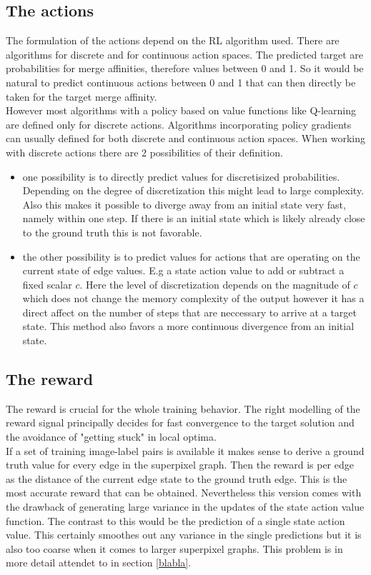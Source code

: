\subsection{The actions}
The formulation of the actions depend on the RL algorithm used. There are algorithms for discrete and for continuous action spaces. The predicted target are probabilities for merge affinities, therefore values between 0 and 1. So it would be natural to predict continuous actions between 0 and 1 that can then directly be taken for the target merge affinity.\\
However most algorithms with a policy based on value functions like Q-learning are defined only for discrete actions. Algorithms incorporating policy gradients can usually defined for both discrete and continuous action spaces. When working with discrete actions there are 2 possibilities of their definition. \\
\begin{itemize}
	\item one possibility is to directly predict values for discretisized probabilities. Depending on the degree of discretization this might lead to large complexity. Also this makes it possible to diverge away from an initial state very fast, namely within one step. If there is an initial state which is likely already close to the ground truth this is not favorable.
	\item the other possibility is to predict values for actions that are operating on the current state of edge values. E.g a state action value to add or subtract a fixed scalar $c$. Here the level of discretization depends on the magnitude of $c$ which does not change the memory complexity of the output however it has a direct affect on the number of steps that are neccessary to arrive at a target state. This method also favors a more continuous divergence from an initial state.
\end{itemize}

\subsection{The reward}
The reward is crucial for the whole training behavior. The right modelling of the reward signal principally decides for fast convergence to the target solution and the avoidance of "getting stuck" in local optima.\\
If a set of training image-label pairs is available it makes sense to derive a ground truth value for every edge in the superpixel graph. Then the reward is per edge as the distance of the current edge state to the ground truth edge. This is the most accurate reward that can be obtained. Nevertheless this version comes with the drawback of generating large variance in the updates of the state action value function. The contrast to this would be the prediction of a single state action value. This certainly smoothes out any variance in the single predictions but it is also too coarse when it comes to larger superpixel graphs. This problem is in more detail attendet to in section \ref{blabla}.

